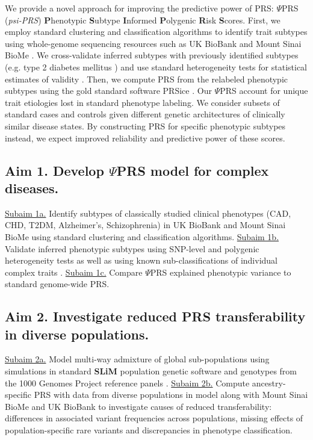 \documentclass[11pt]{article}  %
\newcommand{\inden}[1]{\mbox{} \hspace{#1} } %
\begin{document}
We provide a novel approach for improving the predictive power of PRS: $\Psi$PRS (\textit{psi-PRS}) \textbf{P}henotypic \textbf{S}ubtype \textbf{I}nformed \textbf{P}olygenic \textbf{R}isk \textbf{S}cores. First, we employ standard clustering and classification algorithms to identify trait subtypes using whole-genome sequencing resources such as UK BioBank and Mount Sinai BioMe \cite{bycroft_uk_2018}. We cross-validate inferred subtypes with previously identified subtypes (e.g. type 2 diabetes mellitus \cite{li_identification_2015}) and use standard heterogeneity tests for statistical estimates of validity \cite{dahl_robust_2020}. Then, we compute PRS from the relabeled phenotypic subtypes using the gold standard software PRSice \cite{choi_prsice-2_2019}. Our $\Psi$PRS account for unique trait etiologies lost in standard phenotype labeling. We consider subsets of standard cases and controls given different genetic architectures of clinically similar disease states. By constructing PRS for specific phenotypic subtypes instead, we expect improved reliability and predictive power of these scores.

\subsection*{Aim 1. Develop $\Psi$PRS model for complex diseases.}
\underline{Subaim 1a.} Identify subtypes of classically studied clinical phenotypes (CAD, CHD, T2DM, Alzheimer's, Schizophrenia) in UK BioBank and Mount Sinai BioMe using standard clustering and classification algorithms. \underline{Subaim 1b.} Validate inferred phenotypic subtypes using SNP-level \cite{dahl_reverse_2019} and polygenic heterogeneity tests \cite{dahl_robust_2020} as well as using known sub-classifications of individual complex traits \cite{li_identification_2015}. \underline{Subaim 1c.} Compare $\Psi$PRS explained phenotypic variance to standard genome-wide PRS.

\subsection*{Aim 2. Investigate reduced PRS transferability in diverse populations.}
\underline{Subaim 2a.} Model multi-way admixture of global sub-populations using simulations in standard \textbf{SLiM} population genetic software \cite{haller_slim_2019} and genotypes from the 1000 Genomes Project reference panels \cite{noauthor_global_2015}. \underline{Subaim 2b.} Compute ancestry-specific PRS with data from diverse populations in model along with Mount Sinai BioMe and UK BioBank to investigate causes of reduced transferability: differences in associated variant frequencies across populations, missing effects of population-specific rare variants and discrepancies in phenotype classification. 
\end{document}
